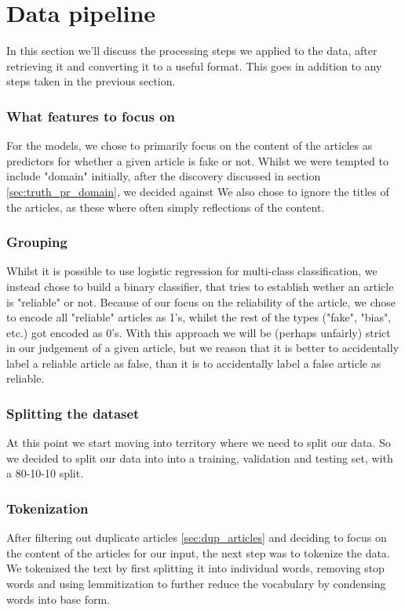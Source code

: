 \section{Data pipeline}
In this section we'll discuss the processing steps we applied to the data, after retrieving it and converting it to a
useful format. This goes in addition to any steps taken in the previous section. 

\subsubsection{What features to focus on}
For the models, we chose to primarily focus on the content of the articles as predictors for whether a given article is
fake or not. Whilst we were tempted to include "domain" initially, after the discovery discussed in section \ref{sec:truth_pr_domain},
we decided against We also chose to ignore the titles of the articles, as these where often simply reflections of the
content.

\subsubsection{Grouping}
Whilst it is possible to use logistic regression for multi-class classification, we instead chose to build a binary
classifier, that tries to establish wether an article is "reliable" or not. Because of our focus on the reliability of
the article, we chose to encode all "reliable" articles as 1's, whilst the rest of the types ("fake", "bias", etc.) got
encoded as 0's. With this approach we will be (perhaps unfairly) strict in our judgement of a given article, but we
reason that it is better to accidentally label a reliable article as false, than it is to accidentally label a false
article as reliable. 

\subsubsection{Splitting the dataset}
At this point we start moving into territory where we need to split our data. So we decided to split our data into into
a training, validation and testing set, with a 80-10-10 split.

\subsubsection{Tokenization}
After filtering out duplicate articles \ref{sec:dup_articles} and deciding to focus on the content of
the articles for our input, the next step was to tokenize the data. We tokenized the text by first splitting it into
individual words, removing stop words and using lemmitization to further reduce the vocabulary by condensing words into
base form.

